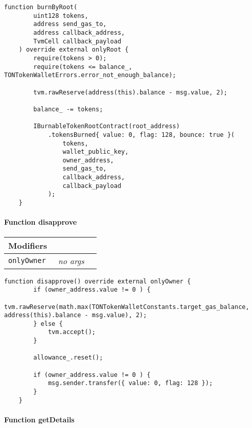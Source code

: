 \vspace{2cm}

\begin{lstlisting}[firstnumber=520]
    function burnByRoot(
        uint128 tokens,
        address send_gas_to,
        address callback_address,
        TvmCell callback_payload
    ) override external onlyRoot {
        require(tokens > 0);
        require(tokens <= balance_, TONTokenWalletErrors.error_not_enough_balance);

        tvm.rawReserve(address(this).balance - msg.value, 2);

        balance_ -= tokens;

        IBurnableTokenRootContract(root_address)
            .tokensBurned{ value: 0, flag: 128, bounce: true }(
                tokens,
                wallet_public_key,
                owner_address,
                send_gas_to,
                callback_address,
                callback_payload
            );
    }
\end{lstlisting}

\paragraph{Function disapprove}


\ifsoltables
\noindent\begin{tabular}{|l|l|p{5cm}|}\hline
\multicolumn{3}{|l|}{\bf Modifiers}\\\hline
\tt onlyOwner & {\em no args} &\\\hline
\end{tabular}
\fi

\vspace{2cm}

\begin{lstlisting}[firstnumber=148]
    function disapprove() override external onlyOwner {
        if (owner_address.value != 0 ) {
            tvm.rawReserve(math.max(TONTokenWalletConstants.target_gas_balance, address(this).balance - msg.value), 2);
        } else {
            tvm.accept();
        }

        allowance_.reset();

        if (owner_address.value != 0 ) {
            msg.sender.transfer({ value: 0, flag: 128 });
        }
    }
\end{lstlisting}

\paragraph{Function getDetails}


